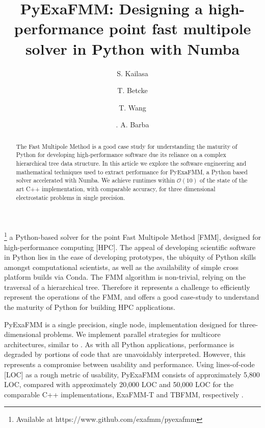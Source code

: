\documentclass{IEEEcsmag}
\begin{document}

\title{PyExaFMM: Designing a high-performance point fast multipole solver in Python with Numba}

\author{S. Kailasa}

\author{T. Betcke}

\author{T. Wang}

\author{. A. Barba}


\begin{abstract}
The Fast Multipole Method is a good case study for understanding the maturity of Python for developing high-performance software due its reliance on a complex hierarchical tree data structure. In this article we explore the software engineering and mathematical techniques used to extract performance for PyExaFMM, a Python based solver accelerated with Numba. We achieve runtimes within $\mathcal{O}(10)$ of the state of the art C++ implementation, with comparable accuracy, for three dimensional electrostatic problems in single precision.
\end{abstract}

\maketitle
{}\footnote{Available at https://www.github.com/exafmm/pyexafmm} a Python-based solver for the point Fast Multipole Method [FMM], designed for high-performance computing [HPC]. The appeal of developing scientific software in Python lies in the ease of developing prototypes, the ubiquity of Python skills amongst computational scientists, as well as the availability of simple cross platform builds via Conda. The FMM algorithm is non-trivial, relying on the traversal of a hierarchical tree. Therefore it represents a challenge to efficiently represent the operations of the FMM, and offers a good case-study to understand the maturity of Python for building HPC applications.


PyExaFMM is a single precision, single node, implementation designed for three-dimensional problems. We implement parallel strategies for multicore architectures, similar to \cite{Bramas2020, Wang2021}. As with all Python applications, performance is degraded by portions of code that are unavoidably interpreted. However, this represents a compromise between usability and performance. Using lines-of-code [LOC] as a rough metric of usability, PyExaFMM consists of approximately 5,800 LOC, compared with approximately 20,000 LOC and 50,000 LOC for the comparable C++ implementations, ExaFMM-T and TBFMM, respectively \cite{Bramas2020, Wang2021}.
\end{document}
